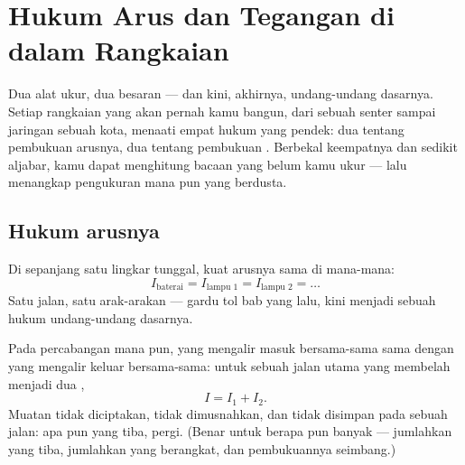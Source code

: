 \chapter{Hukum Arus dan Tegangan di dalam Rangkaian}\label{ch:g8:circuit-laws}

Dua alat ukur, dua besaran --- dan kini, akhirnya, undang-undang
dasarnya. Setiap rangkaian yang akan pernah kamu bangun, dari sebuah
senter sampai jaringan sebuah kota, menaati empat hukum yang pendek:
dua tentang pembukuan arusnya, dua tentang pembukuan .
Berbekal keempatnya dan sedikit aljabar, kamu dapat menghitung bacaan
yang belum kamu ukur --- lalu menangkap pengukuran mana pun yang
berdusta.

\section{Hukum arusnya}

\begin{proposition}\label{prop:g8:circuit-laws:seriesI}
Di sepanjang satu lingkar tunggal, kuat arusnya sama di mana-mana:
\[
I_{\text{baterai}} = I_{\text{lampu 1}} = I_{\text{lampu 2}} =
\dots
\]
Satu jalan, satu arak-arakan --- gardu tol bab yang lalu, kini menjadi
sebuah hukum undang-undang dasarnya.
\end{proposition}

\begin{proposition}\label{prop:g8:circuit-laws:junction}
Pada percabangan mana pun,  yang mengalir masuk bersama-sama
sama dengan  yang mengalir keluar bersama-sama: untuk sebuah
jalan utama yang membelah menjadi dua ,
\[
I = I_1 + I_2 .
\]
Muatan tidak diciptakan, tidak dimusnahkan, dan tidak disimpan pada
sebuah  jalan: apa pun yang tiba, pergi. (Benar untuk berapa pun
banyak  --- jumlahkan yang tiba, jumlahkan yang berangkat, dan
pembukuannya seimbang.)
\end{proposition}

